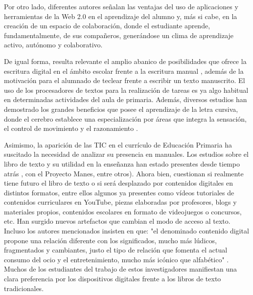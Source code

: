 \documentclass{textolivre}
\begin{document}
Por otro lado, diferentes autores \cite{diaz_lazaro_redes_2013, dahlstrom__2014} señalan las ventajas del uso de aplicaciones y herramientas de la Web 2.0 en el aprendizaje del alumno y, más si cabe, en la creación de un espacio de colaboración, donde el estudiante aprende, fundamentalmente, de sus compañeros, generándose un clima de aprendizaje activo, autónomo y colaborativo. 

De igual forma, resulta relevante el amplio abanico de posibilidades que ofrece la escritura digital en el ámbito escolar frente a la escritura manual \cite{vera_castro_tics_2012}, además de la motivación para el alumnado de teclear frente a escribir un texto manuscrito. El uso de los procesadores de textos para la realización de tareas es ya algo habitual en determinadas actividades del aula de primaria. Además, diversos estudios han demostrado los grandes beneficios que posee el aprendizaje de la letra cursiva, donde el cerebro establece una especialización por áreas que integra la sensación, el control de movimiento y el razonamiento \cite{james_role_2009, james_effects_2012}. 

Asimismo, la aparición de las TIC en el currículo de Educación Primaria ha suscitado la necesidad de analizar su presencia en manuales. Los estudios sobre el libro de texto y su utilidad en la enseñanza han estado presentes desde tiempo atrás \cite{escudero_munoz_investigacion_1983, valls_montes_manuales_1998, choppin_les_2002, escolano_benito_manual_2009, rodriguez_rodriguez_digital_2015, villalain_benito_proyecto_2000}, con el Proyecto Manes, entre otros). Ahora bien, \textcite{san_martin_alonso_controversias_2018} cuestionan si realmente tiene futuro el libro de texto o si será desplazado por contenidos digitales en distintos formatos, entre ellos algunos ya presentes como vídeos tutoriales de contenidos curriculares en YouTube, piezas elaboradas por profesores, blogs y materiales propios, contenidos escolares en formato de videojuegos o concursos, etc. Han surgido nuevos artefactos que cambian el modo de acceso al texto. Incluso los autores mencionados insisten en que: "el denominado contenido digital propone una relación diferente con los significados, mucho más lúdicos, fragmentados y cambiantes, justo el tipo de relación que fomenta el actual consumo del ocio y el entretenimiento, mucho más icónico que alfabético" \cite[p. 8]{san_martin_alonso_controversias_2018}. Muchos de los estudiantes del trabajo de estos investigadores manifiestan una clara preferencia por los dispositivos digitales frente a los libros de texto tradicionales.
\end{document}
